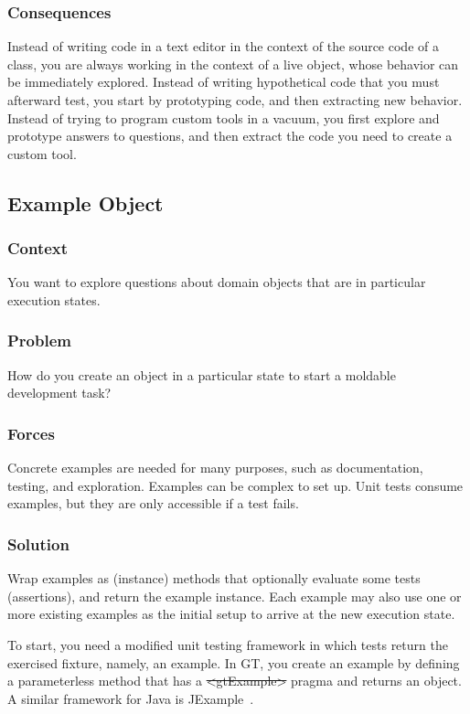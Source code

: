 \documentclass[sigconf]{acmart}
\begin{document}
\subsubsection*{Consequences}
Instead of writing code in a text editor in the context of the source code of a class, you are always working in the context of a live object, whose behavior can be immediately explored.
Instead of writing hypothetical code that you must afterward test, you start by prototyping code, and then extracting new behavior.
Instead of trying to program custom tools in a vacuum, you first explore and prototype answers to questions, and then extract the code you need to create a custom tool.

\subsection*{Example Object}\label{pat:exampleObject}
\subsubsection*{Context}
You want to explore questions about domain objects that are in particular execution states.

\subsubsection*{Problem}
How do you create an object in a particular state to start a moldable development task?

\subsubsection*{Forces}
Concrete examples are needed for many purposes, such as documentation, testing, and exploration.
Examples can be complex to set up.
Unit tests consume examples, but they are only accessible if a test fails.

\subsubsection*{Solution}
Wrap examples as (instance) methods that optionally evaluate some tests (assertions), and return the example instance.
Each example may also use one or more existing examples as the initial setup to arrive at the new execution state.

To start, you need a modified unit testing framework in which tests return the exercised fixture, namely, an example.
In GT, you create an example by defining a parameterless method that has a \st{<gtExample>} pragma and returns an object.
A similar framework for Java is JExample~\cite{Kuhn08a}.
\end{document}
